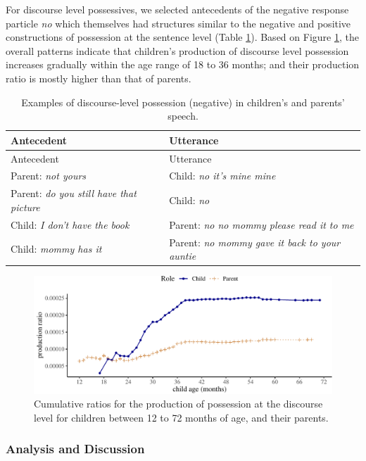 \documentclass[
  english,
  man,floatsintext]{apa6}
\begin{document}
For discourse level possessives, we selected antecedents of the negative response particle \emph{no} which themselves had structures similar to the negative and positive constructions of possession at the sentence level (Table \ref{tab:dispossess}). Based on Figure \ref{fig:possessiondiscourse}, the overall patterns indicate that children's production of discourse level possession increases gradually within the age range of 18 to 36 months; and their production ratio is mostly higher than that of parents.

\begin{longtable}[]{@{}ll@{}}
\caption{\label{tab:dispossess} Examples of discourse-level possession (negative) in children's and parents' speech.}\tabularnewline
\toprule
Antecedent & Utterance \\
\midrule
\endfirsthead
\toprule
Antecedent & Utterance \\
\midrule
\endhead
Parent: \emph{not yours} & Child: \emph{no it's mine mine} \\
Parent: \emph{do you still have that picture} & Child: \emph{no} \\
Child: \emph{I don't have the book} & Parent: \emph{no no mommy please read it to me} \\
Child: \emph{mommy has it} & Parent: \emph{no mommy gave it back to your auntie} \\
\bottomrule
\end{longtable}

\begin{figure}[H]

{\centering \includegraphics{neg_construction_article_files/figure-latex/possessiondiscourse-1} 

}

\caption{Cumulative ratios for the production of possession at the discourse level for children between 12 to 72 months of age, and their parents.}\label{fig:possessiondiscourse}
\end{figure}

\hypertarget{analysis-and-discussion}{%
\subsubsection{Analysis and Discussion}\label{analysis-and-discussion}}
\end{document}
